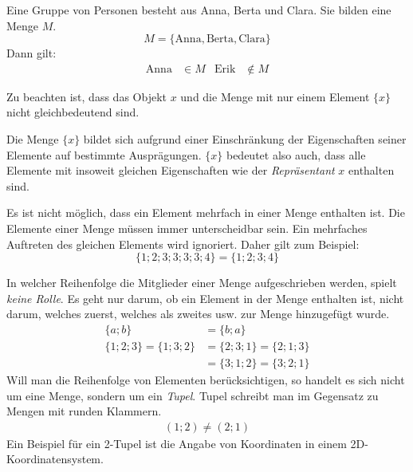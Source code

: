 \begin{bsp}[Mitgliedschaft]
 Eine Gruppe von Personen besteht aus Anna, Berta und Clara. Sie bilden eine Menge \(M\).
 \begin{equation*}
  M = \lbrace \text{Anna}, \text{Berta}, \text{Clara}\rbrace
 \end{equation*}
 Dann gilt:
 \begin{align*}
  \text{Anna} &\in M & \text{Erik} &\not\in M
 \end{align*}
\end{bsp}

\begin{beme}
 Zu beachten ist, dass das Objekt \(x\) und die Menge mit nur einem Element \(\lbrace x\rbrace \) nicht gleichbedeutend sind.
 
 Die Menge \(\lbrace x\rbrace\) bildet sich aufgrund einer Einschränkung der Eigenschaften seiner Elemente auf bestimmte Ausprägungen. \(\lbrace x\rbrace\) bedeutet also auch, dass alle Elemente mit insoweit gleichen Eigenschaften wie der \emph{Repräsentant} \(x\) enthalten sind.
\end{beme}

\begin{beme}[Unterscheidbarkeit]
 Es ist nicht möglich, dass ein Element mehrfach in einer Menge enthalten ist. Die Elemente einer Menge müssen immer unterscheidbar sein. Ein mehrfaches Auftreten des gleichen Elements wird ignoriert. Daher gilt zum Beispiel:
 \begin{equation*}
  \lbrace 1;2;3;3;3;3;4\rbrace  = \lbrace 1;2;3;4\rbrace
 \end{equation*}
\end{beme}

\begin{beme}[Reihenfolge]
 In welcher Reihenfolge die Mitglieder einer Menge aufgeschrieben werden, spielt \emph{keine Rolle}. Es geht nur darum, ob ein Element in der Menge enthalten ist, nicht darum, welches zuerst, welches als zweites usw. zur Menge hinzugefügt wurde.
 \begin{align*}
  \lbrace a;b\rbrace &= \lbrace b;a\rbrace\\
  \lbrace 1;2;3 \rbrace = \lbrace 1;3;2\rbrace &= \lbrace 2;3;1\rbrace = \lbrace 2;1;3\rbrace \\ &= \lbrace 3;1;2\rbrace= \lbrace 3;2;1\rbrace
 \end{align*}
 Will man die Reihenfolge von Elementen berücksichtigen, so handelt es sich nicht um eine Menge, sondern um ein \emph{Tupel}. Tupel schreibt man im Gegensatz zu Mengen mit runden Klammern.
 \begin{align*}
  (1;2) \ne (2;1)
 \end{align*}
 Ein Beispiel für ein 2-Tupel ist die Angabe von Koordinaten in einem 2D-Koordinatensystem.
\end{beme}

